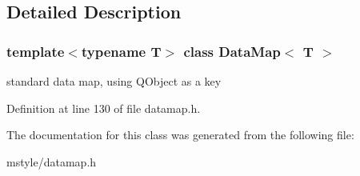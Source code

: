 \subsection{Detailed Description}
\subsubsection*{template$<$typename T$>$\newline
class Data\+Map$<$ T $>$}

standard data map, using Q\+Object as a key 

Definition at line 130 of file datamap.\+h.



The documentation for this class was generated from the following file\+:\begin{DoxyCompactItemize}
\item 
mstyle/datamap.\+h\end{DoxyCompactItemize}
